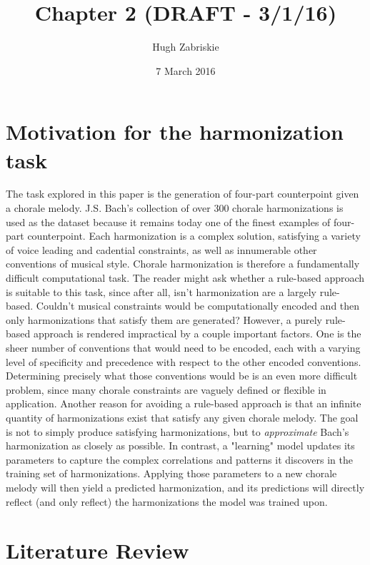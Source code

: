 \documentclass[11pt]{article}
\title{Chapter 2 (DRAFT - 3/1/16)}
\author{Hugh Zabriskie}
\date{7 March 2016}
\begin{document}
\maketitle{}

\section{Motivation for the harmonization task}

The task explored in this paper is the generation of four-part counterpoint given a chorale melody. J.S. Bach's collection of over 300 chorale harmonizations is used as the dataset because it remains today one of the finest examples of four-part counterpoint. Each harmonization is a complex solution, satisfying a variety of voice leading and cadential constraints, as well as innumerable other conventions of musical style. Chorale harmonization is therefore a fundamentally difficult computational task. The reader might ask whether a rule-based approach is suitable to this task, since after all, isn't harmonization are a largely rule-based. Couldn't musical constraints would be computationally encoded and then only harmonizations that satisfy them are generated? However, a purely rule-based approach is rendered impractical by a couple important factors. One is the sheer number of conventions that would need to be encoded, each with a varying level of specificity and precedence with respect to the other encoded conventions. Determining precisely what those conventions would be is an even more difficult problem, since many chorale constraints are vaguely defined or flexible in application. Another reason for avoiding a rule-based approach is that an infinite quantity of harmonizations exist that satisfy any given chorale melody. The goal is not to simply produce satisfying harmonizations, but to \textit{approximate} Bach's harmonization as closely as possible. In contrast, a "learning" model updates its parameters to capture the complex correlations and patterns it discovers in the training set of harmonizations. Applying those parameters to a new chorale melody will then yield a predicted harmonization, and its predictions will directly reflect (and only reflect) the harmonizations the model was trained upon.
  
\section{Literature Review}
\end{document}
